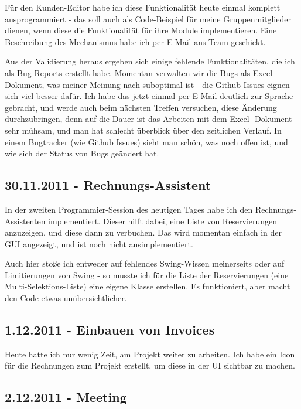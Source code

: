 \documentclass[11pt]{scrartcl}
\begin{document}
Für den Kunden-Editor habe ich diese Funktionalität heute einmal komplett
ausprogrammiert - das soll auch als Code-Beispiel für meine Gruppenmitglieder
dienen, wenn diese die Funktionalität für ihre Module implementieren. Eine
Beschreibung des Mechanismus habe ich per E-Mail ans Team geschickt.

Aus der Validierung heraus ergeben sich einige fehlende Funktionalitäten, die
ich als Bug-Reports erstellt habe. Momentan verwalten wir die Bugs als Excel-
Dokument, was meiner Meinung nach suboptimal ist - die Github Issues eignen
sich viel besser dafür. Ich habe das jetzt einmal per E-Mail deutlich zur
Sprache gebracht, und werde auch beim nächsten Treffen versuchen, diese
Änderung durchzubringen, denn auf die Dauer ist das Arbeiten mit dem Excel-
Dokument sehr mühsam, und man hat schlecht überblick über den zeitlichen
Verlauf. In einem Bugtracker (wie Github Issues) sieht man schön, was noch
offen ist, und wie sich der Status von Bugs geändert hat.


\subsection{30.11.2011 - Rechnungs-Assistent}

In der zweiten Programmier-Session des heutigen Tages habe ich den Rechnungs-
Assistenten implementiert. Dieser hilft dabei, eine Liste von Reservierungen
anzuzeigen, und diese dann zu verbuchen. Das wird momentan einfach in der GUI
angezeigt, und ist noch nicht ausimplementiert.

Auch hier stoße ich entweder auf fehlendes Swing-Wissen meinerseits oder auf
Limitierungen von Swing - so musste ich für die Liste der Reservierungen (eine
Multi-Selektions-Liste) eine eigene Klasse erstellen. Es funktioniert, aber
macht den Code etwas unübersichtlicher.


\subsection{1.12.2011 - Einbauen von Invoices}

Heute hatte ich nur wenig Zeit, am Projekt weiter zu arbeiten. Ich habe ein
Icon für die Rechnungen zum Projekt erstellt, um diese in der UI sichtbar zu
machen.


\subsection{2.12.2011 - Meeting}
\end{document}
